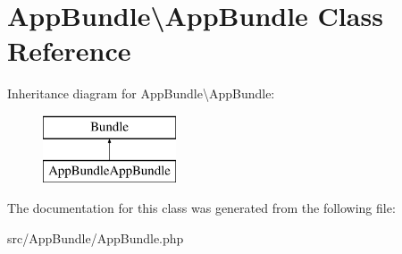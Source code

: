 \hypertarget{class_app_bundle_1_1_app_bundle}{}\section{App\+Bundle\textbackslash{}App\+Bundle Class Reference}
\label{class_app_bundle_1_1_app_bundle}
Inheritance diagram for App\+Bundle\textbackslash{}App\+Bundle\+:\begin{figure}[H]
\begin{center}
\leavevmode
\includegraphics[height=2.000000cm]{class_app_bundle_1_1_app_bundle}
\end{center}
\end{figure}


The documentation for this class was generated from the following file\+:\begin{DoxyCompactItemize}
\item 
src/\+App\+Bundle/App\+Bundle.\+php\end{DoxyCompactItemize}
